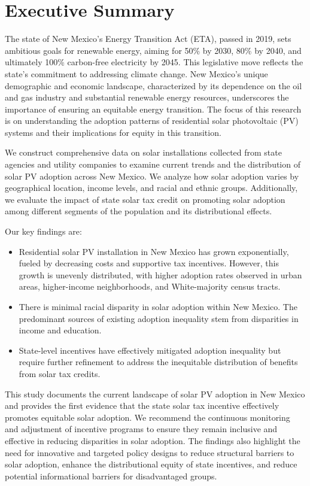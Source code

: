\documentclass[12pt,twoside,letterpaper]{article}
\begin{document}
\onehalfspacing

\clearpage
\setcounter{page}{1}
\section*{Executive Summary}

The state of New Mexico’s Energy Transition Act (ETA), passed in 2019, sets ambitious goals for renewable energy, aiming for 50\% by 2030, 80\% by 2040, and ultimately 100\% carbon-free electricity by 2045. This legislative move reflects the state’s commitment to addressing climate change. New Mexico’s unique demographic and economic landscape, characterized by its dependence on the oil and gas industry and substantial renewable energy resources, underscores the importance of ensuring an equitable energy transition. The focus of this research is on understanding the adoption patterns of residential solar photovoltaic (PV) systems and their implications for equity in this transition.

We construct comprehensive data on solar installations collected from state agencies and utility companies to examine current trends and the distribution of solar PV adoption across New Mexico. We analyze how solar adoption varies by geographical location, income levels, and racial and ethnic groups. Additionally, we evaluate the impact of state solar tax credit on promoting solar adoption among different segments of the population and its distributional effects.

Our key findings are:
\begin{itemize}
    \item Residential solar PV installation in New Mexico has grown exponentially, fueled by decreasing costs and supportive tax incentives. However, this growth is unevenly distributed, with higher adoption rates observed in urban areas, higher-income neighborhoods, and White-majority census tracts.
    \item There is minimal racial disparity in solar adoption within New Mexico. The predominant sources of existing adoption inequality stem from disparities in income and education.
    \item State-level incentives have effectively mitigated adoption inequality but require further refinement to address the inequitable distribution of benefits from solar tax credits.
\end{itemize}

This study documents the current landscape of solar PV adoption in New Mexico and provides the first evidence that the state solar tax incentive effectively promotes equitable solar adoption. We recommend the continuous monitoring and adjustment of incentive programs to ensure they remain inclusive and effective in reducing disparities in solar adoption. The findings also highlight the need for innovative and targeted policy designs to reduce structural barriers to solar adoption, enhance the distributional equity of state incentives, and reduce potential informational barriers for disadvantaged groups.
\end{document}
